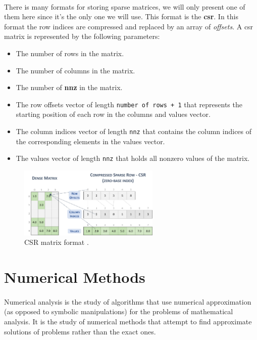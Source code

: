 \paragraph*{}
There is many formats for storing sparse matrices, we will only present one of them here since it's the only one we will use. This format is the \textbf{\acrfull{csr}}. In this format the row indices are compressed and replaced by an array of \textit{offsets}. A \acrshort{csr} matrix is represented by the following parameters:
\begin{itemize}
    \item The number of rows in the matrix.
    \item The number of columns in the matrix.
    \item The number of \textbf{\acrfull{nnz}} in the matrix.
    \item The row offsets vector of length \texttt{number of rows + 1} that represents the starting position of each row in the columns and values vector.
    \item The column indices vector of length \texttt{\acrshort{nnz}} that contains the column indices of the corresponding elements in the values vector.
    \item The values vector of length \texttt{\acrshort{nnz}} that holds all nonzero values of the matrix.
\end{itemize}

\begin{figure}[h]
\includegraphics[width=0.6\textwidth]{assets/figures/csr.png}
\centering
\caption{CSR matrix format \cite{cuSPARSE}.}
\end{figure}


\section{Numerical Methods}
\paragraph*{}
Numerical analysis is the study of algorithms that use numerical approximation (as opposed to symbolic manipulations) for the problems of mathematical analysis. It is the study of numerical methods that attempt to find approximate solutions of problems rather than the exact ones.

